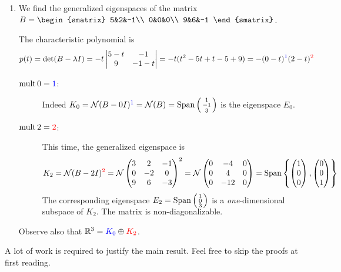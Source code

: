 \begin{examples}{}{}
\begin{enumerate}
	  \item We find the generalized eigenspaces of the matrix $B=
	  \begin{smatrix}
			5&2&-1\\
			0&0&0\\
			9&6&-1
		\end{smatrix}$.\par
		The characteristic polynomial is
		\[
			p(t)=\det(B-\lambda I)=-t
			\begin{vmatrix}
				5-t&-1\\
				9&-1-t
			\end{vmatrix}
			=-t(t^2-5t+t-5+9)
			=-(0-t)^{\textcolor{blue}{1}}(2-t)^{\textcolor{red}{2}}
		\]
		\begin{description}
		  \item[\normalfont$\operatorname{mult} 0=\textcolor{blue}{1}$:] Indeed $K_0=\mathcal{N}(B-0I)^{\textcolor{blue}{1}}
		  =\mathcal{N}(B)=
		  \operatorname{Span}\left(\begin{smallmatrix}1\\-1\\3\end{smallmatrix}\right)$ is the eigenspace $E_0$.
		  \item[\normalfont$\operatorname{mult} 2=\textcolor{red}{2}$:] This time, the generalized eigenspace is
		  \[
		  	K_2=\mathcal{N}(B-2I)^{\textcolor{red}{2}} 
		  	=\mathcal{N}
		  	\begin{pmatrix}
		  		3&2&-1\\
		  		0&-2&0\\
		  		9&6&-3
		  	\end{pmatrix}
		  	^2 =\mathcal{N}
		  	\begin{pmatrix}
		  		0&-4&0\\
		  		0&4&0\\
		  		0&-12&0
		  	\end{pmatrix}
		  	=\operatorname{Span}\left\{\begin{pmatrix}1\\0\\0\end{pmatrix},\begin{pmatrix}0\\0\\1\end{pmatrix}\right\}
		  \]
		  The corresponding eigenspace $\smash[b]{E_2=\operatorname{Span}\left(\begin{smallmatrix}1\\0\\3\end{smallmatrix}\right)}$ is a \emph{one}-dimensional subspace of $K_2$. The matrix is non-diagonalizable.
		\end{description}
		Observe also that $\mathbb{R}^3=\textcolor{blue}{K_0}\oplus \textcolor{red}{K_2}$.
	\end{enumerate}
\end{examples}


\pagebreak[3]



A lot of work is required to justify the main result. Feel free to skip the proofs at first reading.

